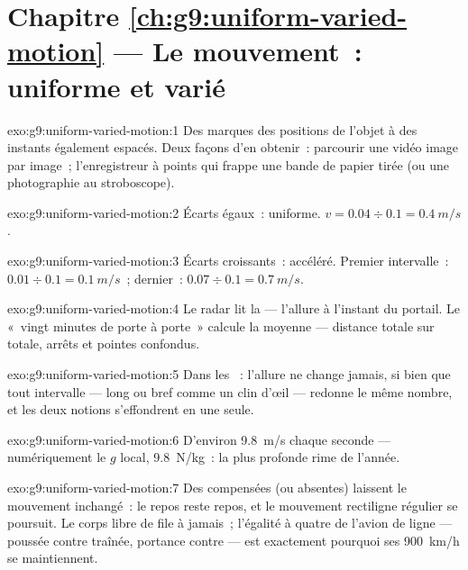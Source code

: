 \section*{Chapitre \ref{ch:g9:uniform-varied-motion} --- Le mouvement~: uniforme et varié}

\begin{solution}{exo:g9:uniform-varied-motion:1}
Des marques des positions de l'objet à des instants également
espacés. Deux façons d'en obtenir~: parcourir une vidéo image par
image~; l'enregistreur à points qui frappe une bande de papier tirée
(ou une photographie au stroboscope).
\end{solution}

\begin{solution}{exo:g9:uniform-varied-motion:2}
Écarts égaux~: uniforme. $v = 0.04 \div 0.1 = \qty{0.4}{m/s}$.
\end{solution}

\begin{solution}{exo:g9:uniform-varied-motion:3}
Écarts croissants~: accéléré. Premier intervalle~:
$0.01 \div 0.1 = \qty{0.1}{m/s}$~; dernier~:
$0.07 \div 0.1 = \qty{0.7}{m/s}$.
\end{solution}

\begin{solution}{exo:g9:uniform-varied-motion:4}
Le radar lit la  --- l'allure à l'instant du
portail. Le «~vingt minutes de porte à porte~» calcule la moyenne ---
distance totale sur  totale, arrêts et pointes confondus.
\end{solution}

\begin{solution}{exo:g9:uniform-varied-motion:5}
Dans les ~: l'allure ne change jamais, si bien que
tout intervalle --- long ou bref comme un clin d'œil --- redonne le
même nombre, et les deux notions s'effondrent en une seule.
\end{solution}

\begin{solution}{exo:g9:uniform-varied-motion:6}
D'environ \qty{9.8}{m/s} chaque seconde --- numériquement le $g$
local, \qty{9.8}{N/kg}~: la plus profonde rime de l'année.
\end{solution}

\begin{solution}{exo:g9:uniform-varied-motion:7}
Des  compensées (ou absentes) laissent le mouvement inchangé~:
le repos reste repos, et le mouvement rectiligne régulier se poursuit.
Le corps libre de  file à jamais~; l'égalité à quatre de l'avion
de ligne --- poussée contre traînée, portance contre  --- est
exactement pourquoi ses \qty{900}{km/h} se maintiennent.
\end{solution}

